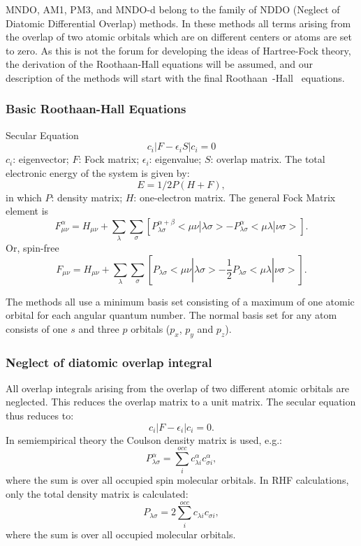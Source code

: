 \documentclass[a4paper]{book}
\begin{document}
MNDO, AM1, PM3, and MNDO-d belong to the family of NDDO (Neglect of Diatomic
Differential Overlap) methods.  In these
methods all terms arising from the overlap of two atomic orbitals which are on
different centers or atoms are set to zero. As this is not the forum for
developing the ideas of Hartree-Fock theory, the derivation of the
Roothaan-Hall equations will be assumed, and our description of the methods
will start with the final Roothaan~\cite{roothaan}-Hall~\cite{hall} equations.

\subsubsection{Basic Roothaan-Hall Equations}
Secular Equation
$$
c_i|F-\epsilon_iS|c_i =0
$$
$c_i$: eigenvector; $F$: Fock matrix; $\epsilon_i$: eigenvalue; $S$: overlap matrix.
The total electronic  energy of the system is given by:
$$
E = 1/2P(H+F),
$$
in which $P$: density matrix; $H$: one-electron matrix.
The general Fock Matrix element is
$$
F_{\mu\nu}^{\alpha} = H_{\mu\nu}+\sum_{\lambda}\sum_{\sigma}
[P_{\lambda\sigma}^{\alpha+\beta}<\mu\nu|\lambda\sigma> - P_{\lambda\sigma}^{\alpha}
<\mu\lambda|\nu\sigma>].
$$
Or, spin-free
$$
F_{\mu\nu} = H_{\mu\nu}+\sum_{\lambda}\sum_{\sigma}
[P_{\lambda\sigma}<\mu\nu|\lambda\sigma> - \frac{1}{2}P_{\lambda\sigma}
<\mu\lambda|\nu\sigma>].
$$

The methods all use a minimum basis set consisting of a maximum of one atomic
orbital for each angular quantum number. The normal basis set for any atom
consists of one $s$ and three $p$ orbitals ($p_x$, $p_y$ and $p_z$).

\subsubsection{Neglect of diatomic overlap integral}
All overlap integrals arising from the overlap of two  different atomic orbitals are neglected.
This reduces the overlap matrix to a unit matrix. The secular equation thus
reduces to:
$$
c_i|F-\epsilon_i|c_i =0.
$$
In semiempirical theory the Coulson \label{ndoi} density matrix is used, e.g.:
$$
P_{\lambda\sigma}^{\alpha} = \sum_i^{occ}c_{\lambda i}^{\alpha}c_{\sigma  i}^{\alpha},
$$
where the sum is over all occupied spin molecular orbitals.
In RHF calculations, only the total density matrix is calculated:
$$
     P_{\lambda\sigma} = 2\sum_i^{occ}c_{\lambda i}c_{\sigma  i},
$$
where the sum is over all occupied  molecular orbitals.
\end{document}
